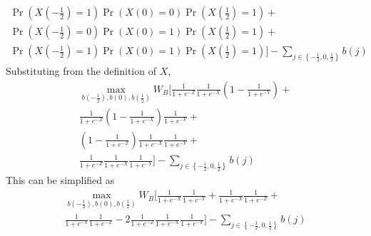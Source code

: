 \documentclass[12pt]{article}
\begin{document}
\begin{enumerate}
\begin{itemize}
\begin{multline}
					\Pr\left(X\left(-\frac{1}{2}\right)=1\right)\Pr\left(X\left(0\right)=0\right)\Pr\left(X\left(\frac{1}{2}\right)=1\right) + \\
					\Pr\left(X\left(-\frac{1}{2}\right)=0\right)\Pr\left(X\left(0\right)=1\right)\Pr\left(X\left(\frac{1}{2}\right)=1\right) + \\
					\Pr\left(X\left(-\frac{1}{2}\right)=1\right)\Pr\left(X\left(0\right)=1\right)\Pr\left(X\left(\frac{1}{2}\right)=1\right) \biggr] - \sum_{j\in \left\{-\frac{1}{2}, 0,\frac{1}{2}\right\}} b(j)
				\end{multline}
			Substituting from the definition of $X$,
			  \begin{multline}
			    \max_{b\left(-\frac{1}{2}\right), b\left(0\right), b\left(\frac{1}{2}\right)} 
					W_B \biggl[ \frac{1}{1+e^{-Z}} \frac{1}{1+e^{-X}} \left(1-\frac{1}{1+e^{-Y}}\right)  + \\
					\frac{1}{1+e^{-Z}} \left(1-\frac{1}{1+e^{-X}}\right) \frac{1}{1+e^{-Y}} + \\
					\left(1-\frac{1}{1+e^{-Z}} \right) \frac{1}{1+e^{-X}} \frac{1}{1+e^{-Y}} + \\
					\frac{1}{1+e^{-Z}} \frac{1}{1+e^{-X}} \frac{1}{1+e^{-Y}} \biggr] - \sum_{j\in \left\{-\frac{1}{2}, 0,\frac{1}{2}\right\}} b(j)
				\end{multline}
			This can be simplified as 
			  \begin{multline}
			    \max_{b\left(-\frac{1}{2}\right), b\left(0\right), b\left(\frac{1}{2}\right)} 
					W_B \biggl[ \frac{1}{1+e^{-X}} \frac{1}{1+e^{-Y}} +
					\frac{1}{1+e^{-X}} \frac{1}{1+e^{-Z}} + \\
					\frac{1}{1+e^{-Y}} \frac{1}{1+e^{-Z}} - 2	\frac{1}{1+e^{-Z}} \frac{1}{1+e^{-X}} \frac{1}{1+e^{-Y}} \biggr] - \sum_{j\in \left\{-\frac{1}{2}, 0,\frac{1}{2}\right\}} b(j)
					\label{eq:objb}
				\end{multline}
				

\end{itemize}
\end{enumerate}
\end{document}
